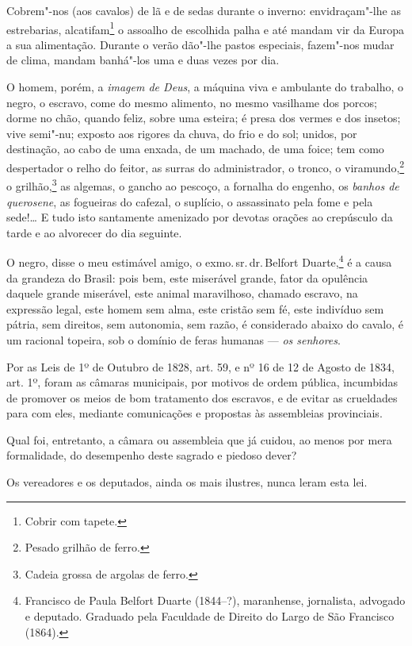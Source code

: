Cobrem"-nos (aos cavalos) de lã e de sedas durante o inverno:
envidraçam"-lhe as estrebarias, alcatifam\footnote{Cobrir com tapete.}
o assoalho de escolhida palha e até mandam vir da Europa a sua
alimentação. Durante o verão dão"-lhe pastos especiais, fazem"-nos mudar
de clima, mandam banhá"-los uma e duas vezes por dia.

O homem, porém, a \emph{imagem de Deus}, a máquina viva e ambulante do
trabalho, o negro, o escravo, come do mesmo alimento, no mesmo vasilhame
dos porcos; dorme no chão, quando feliz, sobre uma esteira; é presa dos
vermes e dos insetos; vive semi"-nu; exposto aos rigores da chuva, do
frio e do sol; unidos, por destinação, ao cabo de uma enxada, de um
machado, de uma foice; tem como despertador o relho do feitor, as surras
do administrador, o tronco, o viramundo,\footnote{Pesado grilhão de
  ferro.} o grilhão,\footnote{Cadeia grossa de argolas de ferro.} as
algemas, o gancho ao pescoço, a fornalha do engenho, os \emph{banhos de
querosene}, as fogueiras do cafezal, o suplício, o assassinato pela fome
e pela sede!\ldots{} E tudo isto santamente amenizado por devotas orações ao
crepúsculo da tarde e ao alvorecer do dia seguinte.

O negro, disse o meu estimável amigo, o exmo.\,sr.\,dr.\,Belfort
Duarte,\footnote{Francisco de Paula Belfort Duarte (1844--?),
  maranhense, jornalista, advogado e deputado. Graduado pela Faculdade
  de Direito do Largo de São Francisco (1864).} é a causa da grandeza do
Brasil: pois bem, este miserável grande, fator da opulência daquele
grande miserável, este animal maravilhoso, chamado escravo, na expressão
legal, este homem sem alma, este cristão sem fé, este indivíduo sem
pátria, sem direitos, sem autonomia, sem razão, é considerado abaixo do
cavalo, é um racional topeira, sob o domínio de feras humanas ---
\emph{os senhores}.

Por as Leis de 1º de Outubro de 1828, art. 59, e nº 16 de 12 de Agosto
de 1834, art. 1º, foram as câmaras municipais, por motivos de ordem
pública, incumbidas de promover os meios de bom tratamento dos escravos,
e de evitar as crueldades para com eles, mediante comunicações e
propostas às assembleias provinciais.

Qual foi, entretanto, a câmara ou assembleia que já cuidou, ao menos por
mera formalidade, do desempenho deste sagrado e piedoso dever?

Os vereadores e os deputados, ainda os mais ilustres, nunca leram esta
lei.


